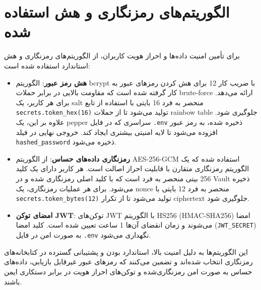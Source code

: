 \documentclass[a4paper,12pt]{article}
\begin{document}
\section{الگوریتم‌های رمزنگاری و هش استفاده شده}
برای تأمین امنیت داده‌ها و احراز هویت کاربران، از الگوریتم‌های رمزنگاری و هش استاندارد استفاده شده است:
\begin{itemize}
    \item \textbf{هش رمز عبور}: الگوریتم bcrypt با ضریب کار 12 برای هش کردن رمزهای عبور به کار گرفته شده است که مقاومت بالایی در برابر حملات brute-force ارائه می‌دهد. برای هر کاربر، یک salt منحصر به فرد 16 بایتی با استفاده از تابع \texttt{secrets.token\_hex(16)} تولید می‌شود تا از حملات rainbow table جلوگیری شود. علاوه بر این، یک pepper سراسری که در فایل \texttt{.env} ذخیره شده، به رمز عبور افزوده می‌شود تا لایه امنیتی بیشتری ایجاد کند. خروجی نهایی در فیلد \texttt{hashed\_password} ذخیره می‌شود.
    \item \textbf{رمزنگاری داده‌های حساس}: از الگوریتم AES-256-GCM استفاده شده که یک الگوریتم رمزنگاری متقارن با قابلیت احراز اصالت است. هر کاربر دارای یک کلید 256 بیتی منحصر به فرد است که با کلید اصلی رمزنگاری شده و در Vault ذخیره می‌شود. برای هر عملیات رمزنگاری، یک nonce منحصر به فرد 12 بایتی با \texttt{secrets.token\_bytes(12)} تولید می‌شود تا از تکرار ciphertext جلوگیری شود.
    \item \textbf{امضای توکن JWT}: توکن‌های JWT با الگوریتم HS256 (HMAC-SHA256) امضا می‌شوند و زمان انقضای آن‌ها 1 ساعت تعیین شده است. کلید امضا (\texttt{JWT\_SECRET}) به صورت امن در فایل \texttt{.env} نگهداری می‌شود.
\end{itemize}
این الگوریتم‌ها به دلیل امنیت بالا، استاندارد بودن و پشتیبانی گسترده در کتابخانه‌های رمزنگاری انتخاب شده‌اند و تضمین می‌کنند که رمزهای عبور غیرقابل بازیابی، داده‌های حساس به صورت امن رمزنگاری‌شده و توکن‌های احراز هویت در برابر دستکاری ایمن باشند.

\end{document}
